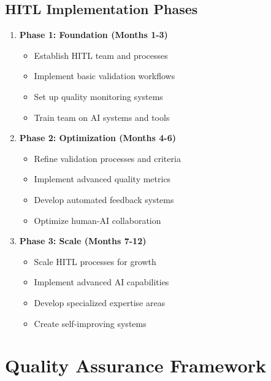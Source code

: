 \documentclass[business]{../templates/infraradar-main}
\begin{document}
\subsection{HITL Implementation Phases}
\begin{enumerate}
    \item \textbf{Phase 1: Foundation (Months 1-3)}
    \begin{itemize}
        \item Establish HITL team and processes
        \item Implement basic validation workflows
        \item Set up quality monitoring systems
        \item Train team on AI systems and tools
    \end{itemize}
    
    \item \textbf{Phase 2: Optimization (Months 4-6)}
    \begin{itemize}
        \item Refine validation processes and criteria
        \item Implement advanced quality metrics
        \item Develop automated feedback systems
        \item Optimize human-AI collaboration
    \end{itemize}
    
    \item \textbf{Phase 3: Scale (Months 7-12)}
    \begin{itemize}
        \item Scale HITL processes for growth
        \item Implement advanced AI capabilities
        \item Develop specialized expertise areas
        \item Create self-improving systems
    \end{itemize}
\end{enumerate}

\section{Quality Assurance Framework}
\end{document}
